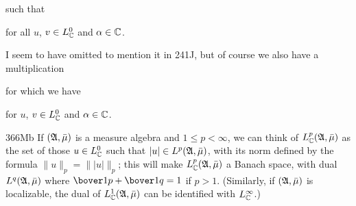 
\noindent such that





\noindent for all $u$, $v\in L^0_{\Bbb C}$ and $\alpha\in\Bbb C$.

I seem to have omitted to mention it in 241J, but of course we also have a
multiplication


\noindent for which we have




\noindent for $u$, $v\in L^0_{\Bbb C}$ and $\alpha\in\Bbb C$.

\spheader 366Mb
If $(\frak A,\bar\mu)$ is a measure algebra and $1\le p<\infty$, we can
think of $L^p_{\Bbb C}(\frak A,\bar\mu)$ as the set of those
$u\in L^0_{\Bbb C}$ such that $|u|\in L^p(\frak A,\bar\mu)$, with
its norm defined by the formula $\|u\|_p=\||u|\|_p$;  this will make
$L^p_{\Bbb C}(\frak A,\bar\mu)$ a Banach space, with dual $L^q(\frak A,\bar\mu)$ where
$\bover1p+\bover1q=1$ if $p>1$.   (Similarly, if
$(\frak A,\bar\mu)$ is localizable, the dual of
$L^1_{\Bbb C}(\frak A,\bar\mu)$ can be identified with
$L^{\infty}_{\Bbb C}$.)

